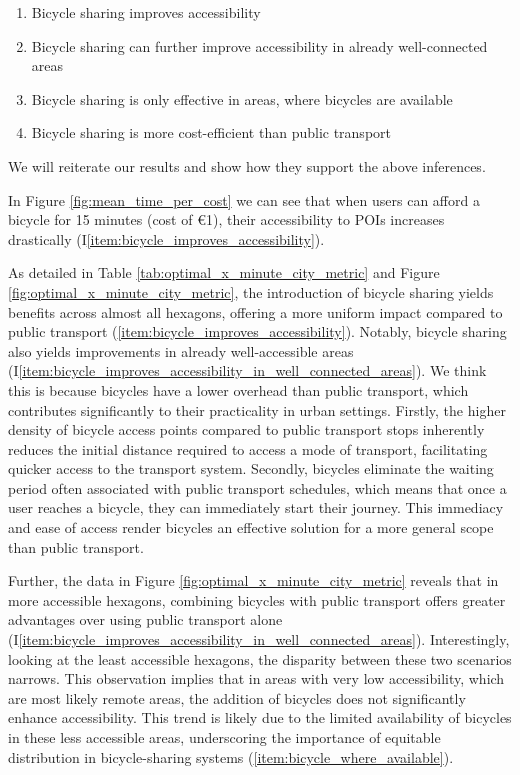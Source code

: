 \begin{enumerate}
  \renewcommand{\labelenumi}{I\theenumi.}
  \item Bicycle sharing improves accessibility \label{item:bicycle_improves_accessibility}
  \item Bicycle sharing can further improve accessibility in already well-connected areas \label{item:bicycle_improves_accessibility_in_well_connected_areas}
  \item Bicycle sharing is only effective in areas, where bicycles are available \label{item:bicycle_where_available}
  \item Bicycle sharing is more cost-efficient than public transport \label{item:bicycle_more_cost_efficient_than_pt}
\end{enumerate}

We will reiterate our results and show how they support the above inferences.

In Figure \ref{fig:mean_time_per_cost} we can see that when users can afford a bicycle for 15 minutes (cost of \euro{1}), their accessibility to POIs increases drastically (I\ref{item:bicycle_improves_accessibility}).

As detailed in Table \ref{tab:optimal_x_minute_city_metric} and Figure \ref{fig:optimal_x_minute_city_metric}, the introduction of bicycle sharing yields benefits across almost all hexagons, offering a more uniform impact compared to public transport (\ref{item:bicycle_improves_accessibility}).
Notably, bicycle sharing also yields improvements in already well-accessible areas (I\ref{item:bicycle_improves_accessibility_in_well_connected_areas}).
We think this is because bicycles have a lower overhead than public transport, which contributes significantly to their practicality in urban settings.
Firstly, the higher density of bicycle access points compared to public transport stops inherently reduces the initial distance required to access a mode of transport, facilitating quicker access to the transport system. 
Secondly, bicycles eliminate the waiting period often associated with public transport schedules, which means that once a user reaches a bicycle, they can immediately start their journey. 
This immediacy and ease of access render bicycles an effective solution for a more general scope than public transport.

Further, the data in Figure \ref{fig:optimal_x_minute_city_metric} reveals that in more accessible hexagons, combining bicycles with public transport offers greater advantages over using public transport alone (I\ref{item:bicycle_improves_accessibility_in_well_connected_areas}).
Interestingly, looking at the least accessible hexagons, the disparity between these two scenarios narrows. 
This observation implies that in areas with very low accessibility, which are most likely remote areas, the addition of bicycles does not significantly enhance accessibility.
This trend is likely due to the limited availability of bicycles in these less accessible areas, underscoring the importance of equitable distribution in bicycle-sharing systems (\ref{item:bicycle_where_available}).

